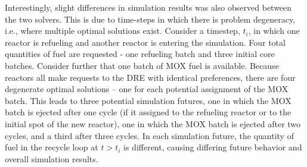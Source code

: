 Interestingly, slight differences in simulation results was also observed
between the two solvers. This is due to time-steps in which there is problem
degeneracy, i.e., where multiple optimal solutions exist. Consider a timestep,
$t_i$, in which one reactor is refueling and another reactor is entering the
simulation. Four total quantities of fuel are requested - one refueling batch
and three initial core batches. Consider further that one batch of MOX fuel is
available. Because reactors all make requests to the DRE with identical
preferences, there are four degenerate optimal solutions -- one for each
potential assignment of the MOX batch. This leads to three potential simulation
futures, one in which the MOX batch is ejected after one cycle (if it assigned
to the refueling reactor or to the initial spot of the new reactor), one in
which the MOX batch is ejected after two cycles, and a third after three
cycles. In each simulation future, the quantity of fuel in the recycle loop at
$t > t_i$ is different, causing differing future behavior and overall simulation
results.

